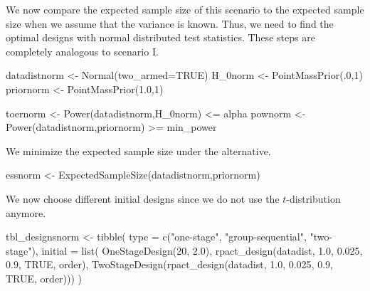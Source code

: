 \documentclass[
]{book}
\newenvironment{Shaded}{\begin{snugshade}}{\end{snugshade}}
\newcommand{\AttributeTok}[1]{\textcolor[rgb]{0.77,0.63,0.00}{#1}}
\newcommand{\ConstantTok}[1]{\textcolor[rgb]{0.00,0.00,0.00}{#1}}
\newcommand{\DecValTok}[1]{\textcolor[rgb]{0.00,0.00,0.81}{#1}}
\newcommand{\FloatTok}[1]{\textcolor[rgb]{0.00,0.00,0.81}{#1}}
\newcommand{\FunctionTok}[1]{\textcolor[rgb]{0.00,0.00,0.00}{#1}}
\newcommand{\NormalTok}[1]{#1}
\newcommand{\OtherTok}[1]{\textcolor[rgb]{0.56,0.35,0.01}{#1}}
\newcommand{\SpecialCharTok}[1]{\textcolor[rgb]{0.00,0.00,0.00}{#1}}
\newcommand{\StringTok}[1]{\textcolor[rgb]{0.31,0.60,0.02}{#1}}
\begin{document}
We now compare the expected sample size of this scenario to the expected sample size when we assume that the variance is known. Thus, we need to find the optimal designs with normal distributed test statistics. These steps are completely analogous to scenario I.

\begin{Shaded}
\begin{Highlighting}[]
\NormalTok{datadistnorm }\OtherTok{\textless{}{-}} \FunctionTok{Normal}\NormalTok{(}\AttributeTok{two\_armed=}\ConstantTok{TRUE}\NormalTok{)}
\NormalTok{H\_0norm }\OtherTok{\textless{}{-}} \FunctionTok{PointMassPrior}\NormalTok{(.}\DecValTok{0}\NormalTok{,}\DecValTok{1}\NormalTok{)}
\NormalTok{priornorm }\OtherTok{\textless{}{-}} \FunctionTok{PointMassPrior}\NormalTok{(}\FloatTok{1.0}\NormalTok{,}\DecValTok{1}\NormalTok{)}

\NormalTok{toernorm }\OtherTok{\textless{}{-}} \FunctionTok{Power}\NormalTok{(datadistnorm,H\_0norm) }\SpecialCharTok{\textless{}=}\NormalTok{ alpha}
\NormalTok{pownorm }\OtherTok{\textless{}{-}} \FunctionTok{Power}\NormalTok{(datadistnorm,priornorm) }\SpecialCharTok{\textgreater{}=}\NormalTok{ min\_power}
\end{Highlighting}
\end{Shaded}

We minimize the expected sample size under the alternative.

\begin{Shaded}
\begin{Highlighting}[]
\NormalTok{essnorm }\OtherTok{\textless{}{-}} \FunctionTok{ExpectedSampleSize}\NormalTok{(datadistnorm,priornorm)}
\end{Highlighting}
\end{Shaded}

We now choose different initial designs since we do not use the \(t\)-distribution anymore.

\begin{Shaded}
\begin{Highlighting}[]
\NormalTok{tbl\_designsnorm }\OtherTok{\textless{}{-}} \FunctionTok{tibble}\NormalTok{(}
    \AttributeTok{type    =} \FunctionTok{c}\NormalTok{(}\StringTok{"one{-}stage"}\NormalTok{, }\StringTok{"group{-}sequential"}\NormalTok{, }\StringTok{"two{-}stage"}\NormalTok{),}
    \AttributeTok{initial =} \FunctionTok{list}\NormalTok{(}
        \FunctionTok{OneStageDesign}\NormalTok{(}\DecValTok{20}\NormalTok{, }\FloatTok{2.0}\NormalTok{),}
        \FunctionTok{rpact\_design}\NormalTok{(datadist, }\FloatTok{1.0}\NormalTok{, }\FloatTok{0.025}\NormalTok{, }\FloatTok{0.9}\NormalTok{, }\ConstantTok{TRUE}\NormalTok{, order),}
        \FunctionTok{TwoStageDesign}\NormalTok{(}\FunctionTok{rpact\_design}\NormalTok{(datadist, }\FloatTok{1.0}\NormalTok{, }\FloatTok{0.025}\NormalTok{, }\FloatTok{0.9}\NormalTok{, }\ConstantTok{TRUE}\NormalTok{, order))) )}
\end{Highlighting}
\end{Shaded}
\end{document}
